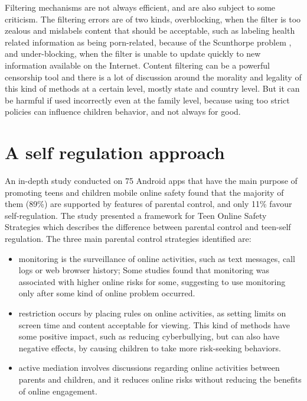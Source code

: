 Filtering mechanisms are not always efficient, and are also subject to some criticism. The filtering errors are of two kinds, overblocking, when the filter is too zealous and mislabels content that should be acceptable, such as labeling health related information as being porn-related, because of the Scunthorpe problem \citep{anh2015scunthorpe}, and under-blocking, when the filter is unable to update quickly to new information available on the Internet. Content filtering can be a powerful censorship tool and there is a lot of discussion around the morality and legality of this kind of methods at a certain level, mostly state and country level. But it can be harmful if used incorrectly even at the family level, because using too strict policies can influence children behavior, and not always for good.


\section{A self regulation approach}

An in-depth study conducted on 75 Android apps that have the main purpose of promoting teens and children mobile online safety found that the majority of them (89\%) are supported by features of parental control, and only 11\% favour self-regulation. \citep{wisniewski2017parental} The study presented a framework for Teen Online Safety Strategies which describes the difference between parental control and teen-self regulation. The three main parental control strategies identified are:

\begin{itemize}
\item monitoring is the surveillance of online activities, such as text messages, call logs or web browser history; Some studies found that monitoring was associated with higher online risks for some, suggesting to use monitoring only after some kind of online problem occurred.\parencite{duerager2012can}
\item restriction occurs by placing rules on online activities, as setting limits on screen time and content acceptable for viewing. This kind of methods have some positive impact, such as reducing cyberbullying, but can also have negative effects, by causing children to take more risk-seeking behaviors. \parencite{shin2014exploring}
\item active mediation involves discussions regarding online activities between parents and children, and it reduces online risks without reducing the benefits of online engagement. \parencite{duerager2012can}
\end{itemize}

